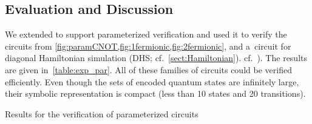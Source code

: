 

\newcommand{\tablePar}[0]{

\begin{wraptable}[8]{r}{4.4cm}
\vspace{-5mm}
\caption{Results for the verification of parameterized circuits}
\vspace{-4mm}
\label{table:exp_par}
\resizebox{\linewidth}{!}{

}
\end{wraptable}
}
\vspace{-0.0mm}
\subsection{Evaluation and Discussion}\label{sec:discussion}
\vspace{-0.0mm}

We extended \tool to support parameterized verification and used it to verify
the circuits from \cref{fig:paramCNOT,fig:1fermionic,fig:2fermionic}, %
and a~circuit for diagonal
Hamiltonian simulation (DHS; 
\ifTR
cf.~\cref{sect:Hamiltonian}).
\else
cf.~\cite{techrep}).
\fi
The results are given in~\cref{table:exp_par}.
All of these families of circuits could be verified efficiently.
Even though the sets of encoded quantum states are infinitely large, their symbolic
representation is compact (less than 10 states and 20 transitions). 

\tablePar

